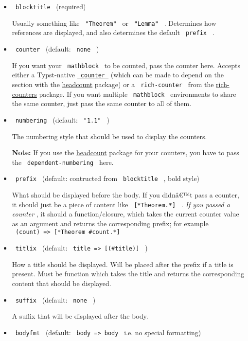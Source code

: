 \begin{itemize}
\item
  \texttt{\ blocktitle\ } (required)

  Usually something like \texttt{\ "Theorem"\ } or \texttt{\ "Lemma"\ }
  . Determines how references are displayed, and also determines the
  default \texttt{\ prefix\ } .
\item
  \texttt{\ counter\ } (default: \texttt{\ none\ } )

  If you want your \texttt{\ mathblock\ } to be counted, pass the
  counter here. Accepts either a Typst-native
  \href{https://typst.app/docs/reference/introspection/counter/}{\texttt{\ counter\ }}
  (which can be made to depend on the section with the
  \href{https://typst.app/universe/package/headcount/}{headcount}
  package) or a \texttt{\ rich-counter\ } from the
  \href{https://typst.app/universe/package/rich-counters/}{rich-counters}
  package. If you want multiple \texttt{\ mathblock\ } environments to
  share the same counter, just pass the same counter to all of them.
\item
  \texttt{\ numbering\ } (default: \texttt{\ "1.1"\ } )

  The numbering style that should be used to display the counters.

  \textbf{Note:} If you use the
  \href{https://typst.app/universe/package/headcount/}{headcount}
  package for your counters, you have to pass the
  \texttt{\ dependent-numbering\ } here.
\item
  \texttt{\ prefix\ } (default: contructed from \texttt{\ blocktitle\ }
  , bold style)

  What should be displayed before the body. If you didnâ€™t pass a
  counter, it should just be a piece of content like
  \texttt{\ {[}*Theorem.*{]}\ } . \emph{If you passed a counter} , it
  should a function/closure, which takes the current counter value as an
  argument and returns the corresponding prefix; for example
  \texttt{\ (count)\ =\textgreater{}\ {[}*Theorem\ \#count.*{]}\ }
\item
  \texttt{\ titlix\ } (default:
  \texttt{\ title\ =\textgreater{}\ {[}(\#title){]}\ } )

  How a title should be displayed. Will be placed after the prefix if a
  title is present. Must be function which takes the title and returns
  the corresponding content that should be displayed.
\item
  \texttt{\ suffix\ } (default: \texttt{\ none\ } )

  A suffix that will be displayed after the body.
\item
  \texttt{\ bodyfmt\ } (default:
  \texttt{\ body\ =\textgreater{}\ body\ } i.e. no special formatting)


\end{itemize}
